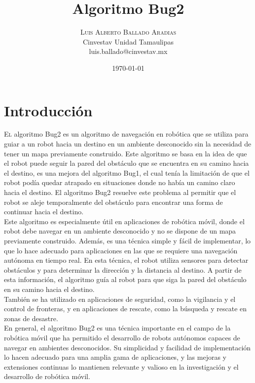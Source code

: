 \documentclass[oneside,onecolumn]{article}
\title{Algoritmo Bug2} %
\author{%
\textsc{Luis Alberto Ballado Aradias} \\%
\normalsize Cinvestav Unidad Tamaulipas \\ %
\normalsize luis.ballado@cinvestav.mx %
}
\date{\today} %
\begin{document}
\maketitle

\section{Introducción}

\lettrine[nindent=0em,lines=3]{E}l algoritmo Bug2 es un algoritmo de navegación en robótica que se utiliza para guiar a un robot hacia un destino en un ambiente desconocido sin la necesidad de tener un mapa previamente construido. Este algoritmo se basa en la idea de que el robot puede seguir la pared del obstáculo que se encuentra en su camino hacia el destino, es una mejora del algoritmo Bug1, el cual tenía la limitación de que el robot podía quedar atrapado en situaciones donde no había un camino claro hacia el destino. El algoritmo Bug2 resuelve este problema al permitir que el robot se aleje temporalmente del obstáculo para encontrar una forma de continuar hacia el destino.\\

Este algoritmo es especialmente útil en aplicaciones de robótica móvil, donde el robot debe navegar en un ambiente desconocido y no se dispone de un mapa previamente construido. Además, es una técnica simple y fácil de implementar, lo que lo hace adecuado para aplicaciones en las que se requiere una navegación autónoma en tiempo real. En esta técnica, el robot utiliza sensores para detectar obstáculos y para determinar la dirección y la distancia al destino. A partir de esta información, el algoritmo guía al robot para que siga la pared del obstáculo en su camino hacia el destino.\\

También se ha utilizado en aplicaciones de seguridad, como la vigilancia y el control de fronteras, y en aplicaciones de rescate, como la búsqueda y rescate en zonas de desastre.\\

En general, el algoritmo Bug2 es una técnica importante en el campo de la robótica móvil que ha permitido el desarrollo de robots autónomos capaces de navegar en ambientes desconocidos. Su simplicidad y facilidad de implementación lo hacen adecuado para una amplia gama de aplicaciones, y las mejoras y extensiones continuas lo mantienen relevante y valioso en la investigación y el desarrollo de robótica móvil.
\end{document}
